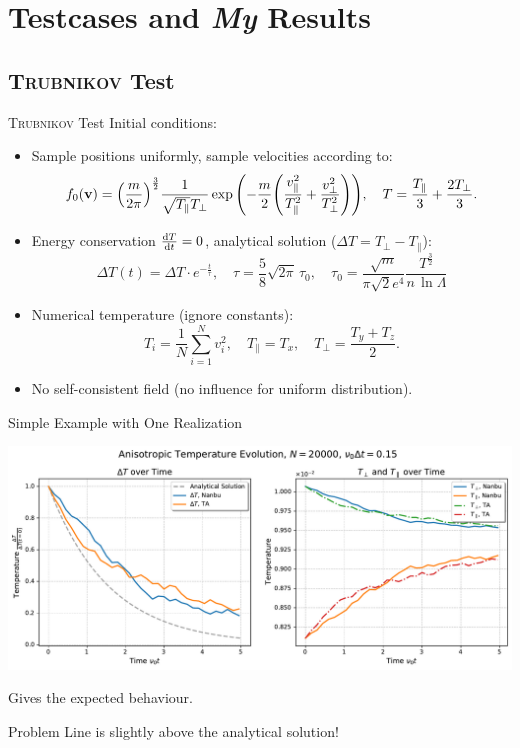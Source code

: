 \section{Testcases and \textit{My} Results}

\subsection{\textsc{Trubnikov} Test}

\begin{frame}{\textsc{Trubnikov} Test}
    Initial conditions:
    \begin{itemize}
        \item Sample positions uniformly, sample velocities according to:
        $$
        f_0(\mathbf{v}) = \qty(\frac{m}{2\pi})^\frac{3}{2} \frac{1}{\sqrt{T_\parallel }T_\perp} \exp\qty( - \frac{m}{2} \qty( \frac{v_\parallel^2}{T_\parallel^2} + \frac{v_\perp^2}{T_\perp^2}) ) , \quad T = \frac{T_\parallel}{3} + \frac{2 T_\perp}{3} .
        $$
        \item Energy conservation $\dv{T}{t} = 0$, analytical solution ($\Delta T = T_\perp - T_\parallel$):
        $$
        \Delta T(t) = \Delta T \cdot e^{-\frac{t}{\tau}}, 
        \quad \tau = \frac{5}{8} \sqrt{2\pi} \,\tau_0,
        \quad \tau_0 = \frac{\sqrt{m}}{\pi \sqrt{2} e^4} \frac{T^{\frac{3}{2}}}{n\,\ln\Lambda}
        $$
        \item Numerical temperature (ignore constants):
        $$
        T_i = \frac{1}{N} \sum_{i = 1}^N v_i^2, \quad T_\parallel = T_x, \quad T_\perp = \frac{T_y + T_z}{2} .
        $$
        \item No self-consistent field (no influence for uniform distribution).
    \end{itemize}
\end{frame}

\begin{frame}{Simple Example with One Realization}
    \begin{minipage}{\textwidth}
        \centering
        \includegraphics[width=\textwidth]{ressources/test1/anisotropic_T_example.pdf}
    \end{minipage}
    Gives the expected behaviour. 
    \begin{alertblock}{Problem}
        Line is slightly above the analytical solution!
    \end{alertblock}
\end{frame}

